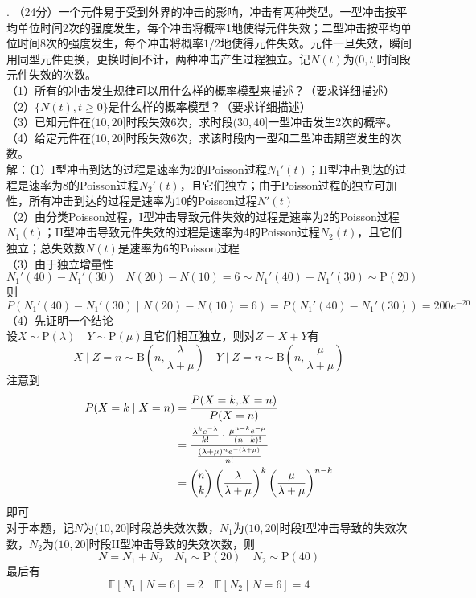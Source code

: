 \documentclass[UTF8,openany]{book}
\begin{document}
. （24分）一个元件易于受到外界的冲击的影响，冲击有两种类型。一型冲击按平均单位时间2次的强度发生，每个冲击将概率1地使得元件失效；二型冲击按平均单位时间8次的强度发生，每个冲击将概率$1/2$地使得元件失效。元件一旦失效，瞬间用同型元件更换，更换时间不计，两种冲击产生过程独立。记$N(t)$为$(0,t]$时间段元件失效的次数。\\
（1）所有的冲击发生规律可以用什么样的概率模型来描述？（要求详细描述）\\
（2）$\{N(t), t \geq 0\}$是什么样的概率模型？（要求详细描述）\\
（3）已知元件在$(10,20]$时段失效6次，求时段$(30,40]$一型冲击发生2次的概率。\\
（4）给定元件在$(10,20]$时段失效6次，求该时段内一型和二型冲击期望发生的次数。\\
解：（1）I型冲击到达的过程是速率为2的Poisson过程$N_1'(t)$；II型冲击到达的过程是速率为8的Poisson过程$N_2'(t)$，且它们独立；由于Poisson过程的独立可加性，所有冲击到达的过程是速率为10的Poisson过程$N'(t)$\\
（2）由分类Poisson过程，I型冲击导致元件失效的过程是速率为2的Poisson过程$N_1(t)$；II型冲击导致元件失效的过程是速率为4的Poisson过程$N_2(t)$，且它们独立；总失效数$N(t)$是速率为6的Poisson过程\\
（3）由于独立增量性
\[
N_1'(40)-N_1'(30)\mid N(20)-N(10)=6 \sim N_1'(40)-N_1'(30) \sim \mathrm{P}(20)
\]
则
\[
P(N_1'(40)-N_1'(30)\mid N(20)-N(10)=6)=P(N_1'(40)-N_1'(30))=200e^{-20}
\]
（4）先证明一个结论\\
设$X\sim \mathrm{P}(\lambda)\quad Y\sim \mathrm{P}(\mu)$且它们相互独立，则对$Z=X+Y$有
\[
X\mid Z=n \sim \mathrm{B}\left(n,\frac{\lambda}{\lambda+\mu} \right) \quad  Y\mid Z=n \sim \mathrm{B}\left(n,\frac{\mu}{\lambda+\mu} \right)
\]
注意到
\begin{align*}
	P(X=k\mid X=n) & = \frac{P(X=k,X=n)}{P(X=n)} \\
	& =\frac{\frac{\lambda^k e^{-\lambda}}{k!}\cdot \frac{\mu^{n-k}e^{-\mu}}{(n-k)!}}{\frac{(\lambda+\mu)^n e^{-(\lambda+\mu)}}{n!}}\\
	&= \dbinom{n}{k} \left(\frac{\lambda}{\lambda+\mu} \right)^k \left(\frac{\mu}{\lambda+\mu} \right)^{n-k}  
\end{align*}
即可\\
对于本题，记$N$为$(10,20]$时段总失效次数，$N_1$为$(10,20]$时段I型冲击导致的失效次数，$N_2$为$(10,20]$时段II型冲击导致的失效次数，则
\[
N=N_1+N_2 \quad N_1\sim \mathrm{P}(20) \quad N_2\sim \mathrm{P}(40)
\]
最后有
\[
\mathbb{E}[N_1\mid N=6]=2 \quad \mathbb{E}[N_2\mid N=6]=4
\]\\
\end{document}
